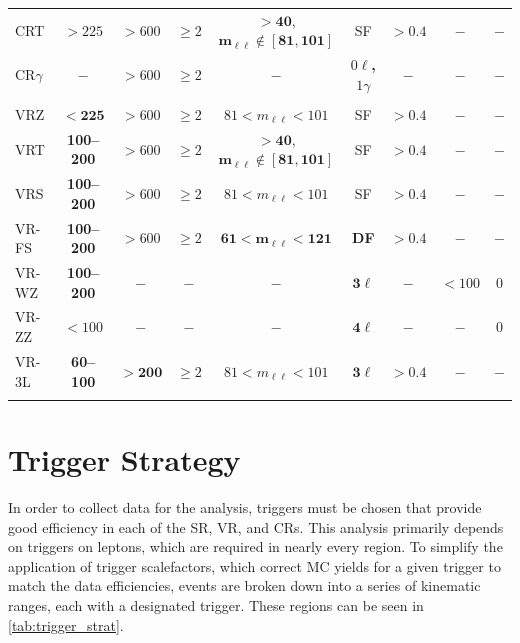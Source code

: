 \begin{table}[htbp]
\begin{center}
{\begin{tabular}{lcccccccc}
   CRT              &  $> 225$  &  $> 600$  &  $\geq 2$   &  $\mathbf{>40}$, $\mathbf{m_{\ell\ell} \notin [81,101]}$  &  SF  & $>0.4$ & $-$  &  $-$ \\
   CR$\gamma$       &  $-$        &  $> 600$  &  $\geq 2$   &  $-$                                                        &  {\bf $0\ell$, $1\gamma$}  & $-$ & $-$  &  $-$ \\
   \noalign{\smallskip}\hline\noalign{\smallskip}
   \multicolumn{2}{l}{Validation regions} &&&&&& \\
   \noalign{\smallskip}\hline\noalign{\smallskip}
   VRZ  &   $\mathbf{<225}$      &  $> 600$   &  $\geq 2$  &    $81 < m_{\ell\ell} < 101$       &  SF        & $>0.4$  & $-$ & $-$ \\
   VRT  &  {\bf 100--200}     &  $> 600 $  &  $\geq 2$  &    $\mathbf{>40}$, $\mathbf{m_{\ell\ell} \notin [81,101]}$  &  SF        & $>0.4$  & $-$ & $-$ \\
   VRS  &  {\bf 100--200}     &  $> 600 $  &  $\geq 2$  &    $81 < m_{\ell\ell} < 101$       &  SF        & $>0.4$  & $-$ & $-$ \\
   VR-FS & {\bf 100--200}     &  $> 600 $  &  $\geq 2$  &    $\mathbf{61 < m_{\ell\ell} < 121}$  &  {\bf DF}        & $>0.4$  & $-$ & $-$ \\
   VR-WZ  &  {\bf 100--200}   &     $-$      &   $-$        &         $-$                          &  $\mathbf{3\ell}$   &    $-$    & $<100$  &  $0$  \\
   VR-ZZ  &  {\bf $<100$}     &     $-$      &   $-$        &         $-$                          &  $\mathbf{4\ell}$   &    $-$    &  $-$      & $0$   \\
   VR-3L  &  {\bf 60--100}    &  $\mathbf{> 200}$  &  $\geq 2$  &   $81 < m_{\ell\ell} < 101$        &  $\mathbf{3\ell}$   & $>0.4$  & $-$ & $-$ \\
   \noalign{\smallskip}\hline\noalign{\smallskip}
\end{tabular}
} %
\label{tab:regions-z}
\end{center}
\end{table}

\section{Trigger Strategy}
\label{sec:trig_strategy}

In order to collect data for the analysis, triggers must be chosen that provide good efficiency in each of the \ac{SR}, \ac{VR}, and \acp{CR}. This analysis primarily depends on triggers on leptons, which are required in nearly every region. To simplify the application of trigger scalefactors, which correct \ac{MC} yields for a given trigger to match the data efficiencies, events are broken down into a series of kinematic ranges, each with a designated trigger. These regions can be seen in \autoref{tab:trigger_strat}. 

